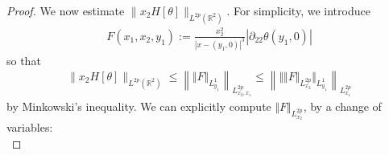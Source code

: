 \documentclass[10pt]{amsart}
\theoremstyle{definition}
\theoremstyle{remark}
\numberwithin{equation}{section}
\newcommand{\nrm}[1]{\Vert#1\Vert}
\newcommand{\ud}{\mathrm{d}}
\newcommand{\0}{\emptyset}
\newcommand{\tht}{\theta}
\newcommand{\bbR}{\mathbb R}
\begin{document}
\begin{proof}
			We now estimate $\| x_2 H[\tht] \|_{L^{2p}(\bbR^2)}$. For simplicity, we introduce \begin{equation*}
				\begin{split}
					F(x_1,x_2,y_1) := \frac{x_2^{2}}{|x-(y_1,0)|^3} |\partial_{22} \tht(y_1,0)|
				\end{split}
			\end{equation*} so that \begin{equation*}
				\begin{split}
					\| x_2 H[\tht] \|_{L^{2p}(\bbR^2)} \le \left\| \nrm{F}_{L^{1}_{y_1}} \right\|_{L^{2p}_{x_2,x_1}} \le \left\| \nrm{ \nrm{F}_{L^{2p}_{x_2}} }_{L^{1}_{y_1}} \right\|_{L^{2p}_{x_1}}
				\end{split}
			\end{equation*} by Minkowski's inequality. We can explicitly compute $\nrm{F}_{L^{2p}_{x_2}}$, by a change of variables: \begin{equation*}

\end{equation*}
\end{proof}
\end{document}
